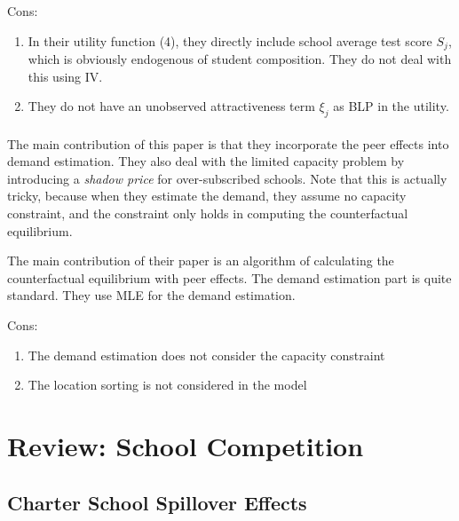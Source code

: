 Cons:
\vspace{-1em}
\begin{enumerate}
    \item In their utility function (4), they directly include school average test score $S_j$, which is obviously endogenous of student composition. They do not deal with this using IV.
    \item They do not have an unobserved attractiveness term $\xi_j$ as BLP in the utility.
\end{enumerate}

\paragraph{\citet{EppleJhaSieg2018}}

The main contribution of this paper is that they incorporate the peer effects into demand estimation. 
They also deal with the limited capacity problem by introducing a \textit{shadow price} for over-subscribed schools.
Note that this is actually tricky, because when they estimate the demand, they assume no capacity constraint, and the constraint only holds in computing the counterfactual equilibrium.

The main contribution of their paper is an algorithm of calculating the counterfactual equilibrium with peer effects.
The demand estimation part is quite standard.
They use MLE for the demand estimation.


Cons:
\begin{enumerate}
    \item The demand estimation does not consider the capacity constraint
    \item The location sorting is not considered in the model
\end{enumerate}


\section{Review: School Competition} %
\label{sec:review_spillover_effects}

\subsection*{Charter School Spillover Effects}

\paragraph{\citet*{BookerGilpatricGronbergEtAl2008}} 

